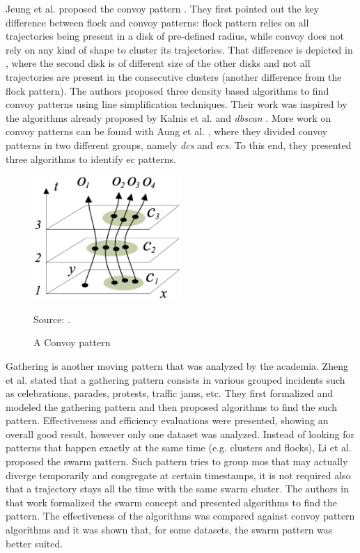Jeung et al. proposed the convoy pattern \citep{convoy2}\citep{convoy}. They first pointed out the key difference
between flock and convoy patterns: flock pattern relies on all trajectories being present in a disk of pre-defined
radius, while convoy does not rely on any kind of shape to cluster its trajectories. That difference is depicted in
, where the second disk is of different size of the other disks and not all trajectories are
present in the consecutive clusters (another difference from the flock pattern). The authors proposed three density
based algorithms to find convoy patterns using line simplification techniques. Their work was inspired by the algorithms
already proposed by Kalnis et al. \citep{movingclusters} and \textit{\ac{dbscan}} \citep{dbscan}. More work on convoy
patterns can be found with Aung et al. \citep{convoy3}, where they divided convoy patterns in two different groups,
namely \textit{\acp{dc}} and \textit{\acp{ec}}. To this end, they presented three algorithms to identify \ac{ec}
patterns.

\begin{figure}
    \centering
    \caption{A Convoy pattern}
    \centerline{\includegraphics[width=0.5\textwidth]{images/convoy.eps}}
    \footnotesize{Source: \citep{convoy2}.}
    \label{fig:convoy_pattern}
\end{figure}

Gathering is another moving pattern that was analyzed by the academia. Zheng et al. \citep{gathering} stated that a
gathering pattern consists in various grouped incidents such as celebrations, parades, protests, traffic jams, etc. They
first formalized and modeled the gathering pattern and then proposed algorithms to find the such pattern. Effectiveness
and efficiency evaluations were presented, showing an overall good result, however only one dataset was analyzed.
Instead of looking for patterns that happen exactly at the same time (e.g. clusters and flocks), Li et al. \citep{swarm}
proposed the swarm pattern. Such pattern tries to group \acp{mo} that may actually diverge temporarily and congregate at
certain timestamps, it is not required also that a trajectory stays all the time with the same swarm cluster. The
authors in that work formalized the swarm concept and presented algorithms to find the pattern. The effectiveness of the
algorithms was compared against convoy pattern algorithms and it was shown that, for some datasets, the swarm pattern
was better suited.

